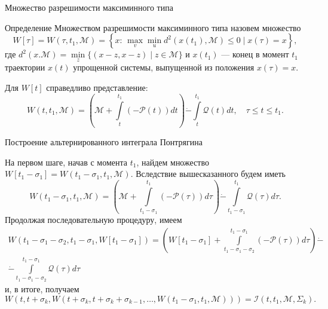 \documentclass{beamer}
\begin{document}
\begin{frame}{Множество разрешимости максиминного типа}
    
\begin{block}{Определение}
    Множеством разрешимости максиминного типа назовем множество
    \begin{equation*}
        W[\tau] = W(\tau, t_1, \mathcal{M}) = \left\{ x: \, \max_v \min_u
         d^2(x(t_1), \mathcal{M}) \le 0 \mid x(\tau) = x \right\}, 
    \end{equation*}
     где \( d^2(x. \mathcal{M}) = \min\limits_z \{ (x-z,x-z) \mid z \in 
     \mathcal{M} \} \) и \( x(t_1) \) --- конец в момент \( t_1 \) траектории
     \( x(t) \) упрощенной системы, выпущенной из положения \( x(\tau) = x \).
\end{block}

Для \( W[t] \) справедливо представление:
    \begin{equation*}
        W(t,t_1,\mathcal{M}) = \left( \mathcal{M} + \int\limits_t^{t_1} 
         (-\mathcal{P}(t)) dt \right) \dot{-} \int\limits_t^{t_1} \mathcal{Q}(t) dt,
         \quad \tau \le t \le t_1.
    \end{equation*}
    
\end{frame}

\begin{frame}{Построение альтернированного интеграла Понтрягина}

На первом шаге, начав с момента \( t_1 \), найдем множество \( W[t_1 - \sigma_1] = 
 W(t_1 - \sigma_1, t_1, \mathcal{M}) \). Вследствие вышесказанного будем иметь
\small
\begin{equation*}
     W(t_1 - \sigma_1, t_1, \mathcal{M}) = \left( \mathcal{M} + \int\limits_{t_1 - \sigma_1}
     ^{t_1}(-\mathcal{P}(\tau)) d\tau \right) \dot{-} \int\limits_{t_1 - \sigma_1}^{t_1}
     \mathcal{Q}(\tau)d\tau.
\end{equation*}
\normalsize
Продолжая последовательную процедуру, имеем
\small
\begin{equation*}
    \begin{gathered}
        W(t_1 - \sigma_1 -\sigma_2, t_1 - \sigma_1, W[t_1 - \sigma_1]) = \left( W[t_1 - \sigma_1]
        + \int\limits_{t_1 - \sigma_1 - \sigma_2}^{t_1 - \sigma_1} (-\mathcal{P}(\tau))d\tau \right)
        \dot{-} \\
        \dot{-} \int\limits_{t_1 - \sigma_1 - \sigma_2}^{t_1 - \sigma_1} \mathcal{Q}(\tau) d\tau
    \end{gathered}
\end{equation*}
\normalsize
и, в итоге, получаем
\small
\begin{equation*}
    W(t, t + \sigma_k, W(t + \sigma_k, t + \sigma_k + \sigma_{k-1}, \dots, W(t_1 - \sigma_1, t_1,
    \mathcal{M}))) = \mathcal{I}(t, t_1, \mathcal{M}, \Sigma_k).
\end{equation*}
\normalsize
    
\end{frame}
\end{document}
